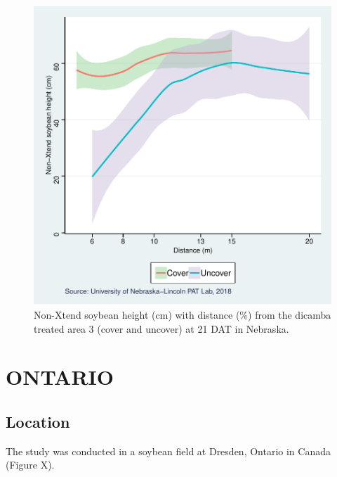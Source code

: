 \documentclass[]{article}
\begin{document}
\begin{figure}
\centering
\includegraphics{Report_Dicamba_study_files/figure-latex/unnamed-chunk-78-1.pdf}
\caption{Non-Xtend soybean height (cm) with distance (\%) from the
dicamba treated area 3 (cover and uncover) at 21 DAT in Nebraska.}
\end{figure}

\newpage

\pagebreak

\section{ONTARIO}\label{ontario-1}

\subsection{Location}\label{location-4}

The study was conducted in a soybean field at Dresden, Ontario in Canada
(Figure X).
\end{document}
